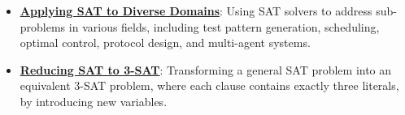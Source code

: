 \documentclass{article}%
\begin{document}
\begin{itemize}[leftmargin=*]
\item \href{https://purdue.brightspace.com/d2l/common/assets/pdfjs-d2l-dist/1.0.14-legacy/web/viewer.html?file=\%2Fcontent\%2Fenforced\%2F1095467-wl.202510.CS.24300.001\%2F13L1-Logic.pdf\%3Fou\%3D1095467\&lang=en-us\&container=d2l-fileviewer-rendered-pdf\&fullscreen=d2l-fileviewer-rendered-pdf-dialog\&height=667#page=23}{\textbf{Applying SAT to Diverse Domains}}: Using SAT solvers to address sub-problems in various fields, including test pattern generation, scheduling, optimal control, protocol design, and multi-agent systems.%
\item \href{https://purdue.brightspace.com/d2l/common/assets/pdfjs-d2l-dist/1.0.14-legacy/web/viewer.html?file=\%2Fcontent\%2Fenforced\%2F1095467-wl.202510.CS.24300.001\%2F13L1-Logic.pdf\%3Fou\%3D1095467\&lang=en-us\&container=d2l-fileviewer-rendered-pdf\&fullscreen=d2l-fileviewer-rendered-pdf-dialog\&height=667#page=24}{\textbf{Reducing SAT to 3{-}SAT}}: Transforming a general SAT problem into an equivalent 3-SAT problem, where each clause contains exactly three literals, by introducing new variables.%
\end{itemize}%
\end{document}
